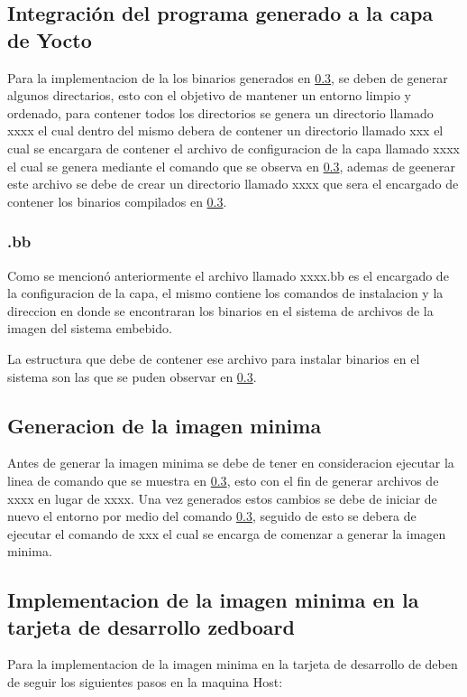 \subsection{Integración del programa generado a la capa de Yocto}

Para la implementacion de la los binarios generados en \ref{}, se deben de generar algunos directarios, esto con el objetivo de mantener un entorno limpio y ordenado, para contener todos los directorios se genera un directorio llamado xxxx el cual dentro del mismo debera de contener un directorio llamado xxx el cual se encargara de contener el archivo de configuracion de la capa llamado xxxx el cual se genera mediante el comando que se observa en \ref{}, ademas de geenerar este archivo se debe de crear un directorio llamado xxxx que sera el encargado de contener los binarios compilados en \ref{}.

\subsubsection{.bb}

Como se mencionó anteriormente el archivo llamado xxxx.bb es el encargado de la configuracion de la capa, el mismo contiene los comandos de instalacion y la direccion en donde se encontraran los binarios en el sistema de archivos de la imagen del sistema embebido.

La estructura que debe de contener ese archivo para instalar binarios en el sistema son las que se puden observar en \ref{}.

\subsection{Generacion de la imagen minima}

Antes de generar la imagen minima se debe de tener en consideracion ejecutar la linea de comando que se muestra en \ref{}, esto con el fin de generar archivos de xxxx en lugar de xxxx. Una vez generados estos cambios se debe de iniciar de nuevo el entorno por medio del comando \ref{}, seguido de esto se debera de ejecutar el comando de xxx el cual se encarga de comenzar a generar la imagen minima. 

\subsection{Implementacion de la imagen minima en la tarjeta de desarrollo zedboard}

Para la implementacion de la imagen minima en la tarjeta de desarrollo de deben de seguir los siguientes pasos en la maquina Host:

